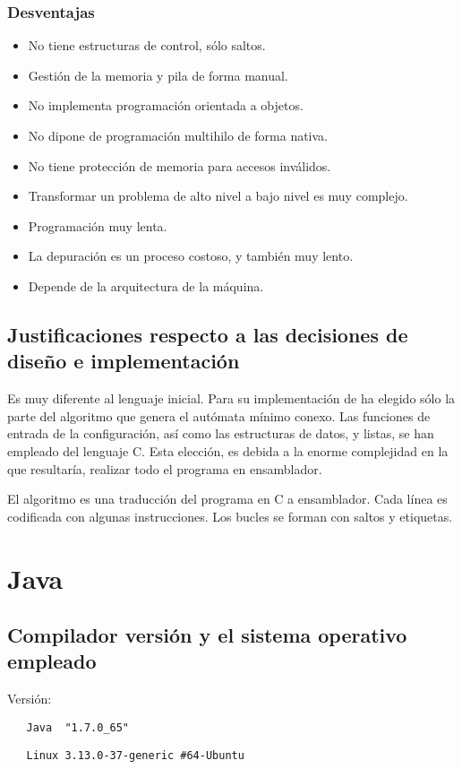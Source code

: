 \documentclass[12pt,a4paper]{article}
\begin{document}
\subsubsection{Desventajas}
\begin{itemize}
\item No tiene estructuras de control, sólo saltos.
\item Gestión de la memoria y pila de forma manual.
\item No implementa programación orientada a objetos.
\item No dipone de programación multihilo de forma nativa.
\item No tiene protección de memoria para accesos inválidos.
\item Transformar un problema de alto nivel a bajo nivel es muy complejo.
\item Programación muy lenta.
\item La depuración es un proceso costoso, y también muy lento.
\item Depende de la arquitectura de la máquina.
\end{itemize}


\subsection{Justificaciones respecto a las decisiones de diseño e 
implementación}

Es muy diferente al lenguaje inicial. Para su implementación de ha elegido sólo 
la parte del algoritmo que genera el autómata mínimo conexo. Las funciones de 
entrada de la configuración, así como las estructuras de datos, y listas, se han 
empleado del lenguaje C. Esta elección, es debida a la enorme complejidad en la 
que resultaría, realizar todo el programa en ensamblador.

El algoritmo es una traducción del programa en C a ensamblador. Cada línea es 
codificada con algunas instrucciones. Los bucles se forman con saltos y 
etiquetas.


  \section{Java}
   \subsection{Compilador versión y el sistema operativo empleado}
   Versión:
   \begin{lstlisting}
   Java  "1.7.0_65"
   \end{lstlisting}
   \begin{lstlisting}
   Linux 3.13.0-37-generic #64-Ubuntu
   \end{lstlisting}
\end{document}
